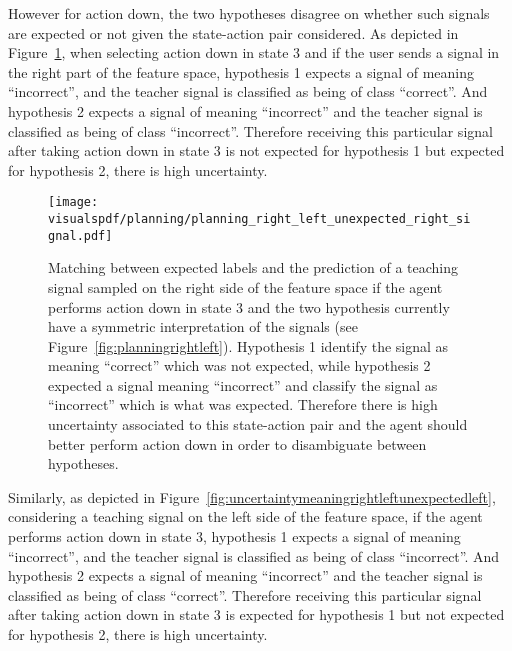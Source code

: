 \visuopti{\newpage}

However for action down, the two hypotheses disagree on whether such signals are expected or not given the state-action pair considered. As depicted in Figure~\ref{fig:uncertaintymeaningrightleftunexpectedright}, when selecting action down in state 3 and if the user sends a signal in the right part of the feature space, hypothesis 1 expects a signal of meaning ``incorrect'', and the teacher signal is classified as being of class ``correct''. And hypothesis 2 expects a signal of meaning ``incorrect'' and the teacher signal is classified as being of class ``incorrect''. Therefore receiving this particular signal after taking action down in state 3 is not expected for hypothesis 1 but expected for hypothesis 2, there is high uncertainty.

\begin{figure}[H]
  \centering
  \texttt{[image: \\visualspdf/planning/planning\_right\_left\_unexpected\_right\_signal.pdf]}
  \caption{Matching between expected labels and the prediction of a teaching signal sampled on the right side of the feature space if the agent performs action down in state 3 and the two hypothesis currently have a symmetric interpretation of the signals (see Figure~\ref{fig:planningrightleft}). Hypothesis 1 identify the signal as meaning ``correct'' which was not expected, while hypothesis 2 expected a signal meaning ``incorrect'' and classify the signal as ``incorrect'' which is what was expected. Therefore there is high uncertainty associated to this state-action pair and the agent should better perform action down in order to disambiguate between hypotheses. }
  \label{fig:uncertaintymeaningrightleftunexpectedright}
\end{figure}

\visuopti{\newpage}

Similarly, as depicted in Figure~\ref{fig:uncertaintymeaningrightleftunexpectedleft}, considering a teaching signal on the left side of the feature space, if the agent performs action down in state 3, hypothesis 1 expects a signal of meaning ``incorrect'', and the teacher signal is classified as being of class ``incorrect''. And hypothesis 2 expects a signal of meaning ``incorrect'' and the teacher signal is classified as being of class ``correct''. Therefore receiving this particular signal after taking action down in state 3 is expected for hypothesis 1 but not expected for hypothesis 2, there is high uncertainty.

